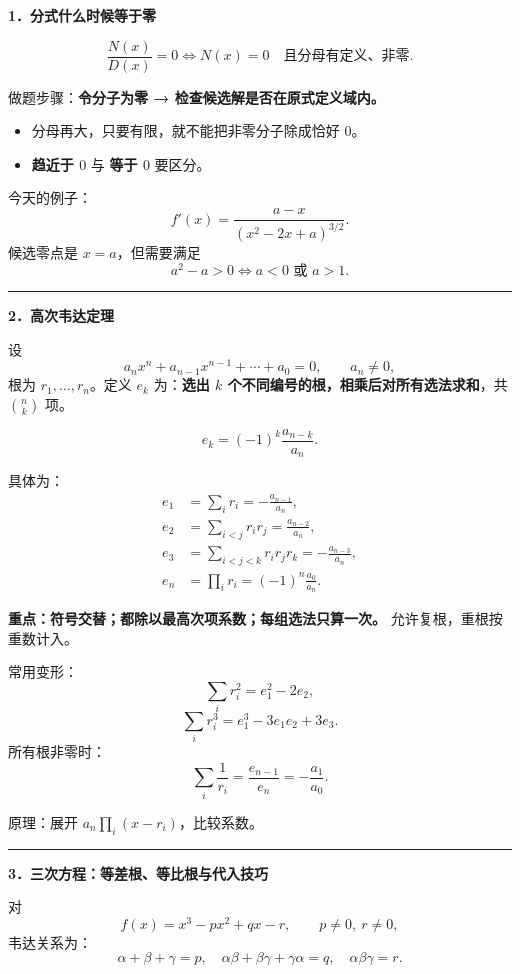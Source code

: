 \documentclass[
  UTF8]{ctexart}
\author{}
\date{}
\providecommand{\tightlist}{%
  \setlength{\itemsep}{0pt}\setlength{\parskip}{0pt}}
\begin{document}
\textbf{1．分式什么时候等于零}

\[
\boxed{
\frac{N(x)}{D(x)}=0
\iff
N(x)=0\quad\text{且分母有定义、非零}.
}
\]

做题步骤：\textbf{令分子为零 → 检查候选解是否在原式定义域内。}

\begin{itemize}
\tightlist
\item
  分母再大，只要有限，就不能把非零分子除成恰好 \(0\)。
\item
  \textbf{趋近于 \(0\)} 与 \textbf{等于 \(0\)} 要区分。
\end{itemize}

今天的例子： \[
f'(x)=\frac{a-x}{(x^2-2x+a)^{3/2}}.
\] 候选零点是 \(x=a\)，但需要满足 \[
a^2-a>0
\iff
\boxed{a<0\text{ 或 }a>1}.
\]

\begin{center}\rule{0.5\linewidth}{0.5pt}\end{center}

\textbf{2．高次韦达定理}

设 \[
a_nx^n+a_{n-1}x^{n-1}+\cdots+a_0=0,\qquad a_n\ne0,
\] 根为 \(r_1,\ldots,r_n\)。定义 \(e_k\) 为：\textbf{选出 \(k\)
个不同编号的根，相乘后对所有选法求和}，共 \(\binom nk\) 项。

\[
\boxed{e_k=(-1)^k\frac{a_{n-k}}{a_n}}.
\]

具体为： \[
\begin{aligned}
e_1&=\sum_i r_i=-\frac{a_{n-1}}{a_n},\\
e_2&=\sum_{i<j}r_ir_j=\frac{a_{n-2}}{a_n},\\
e_3&=\sum_{i<j<k}r_ir_jr_k=-\frac{a_{n-3}}{a_n},\\
e_n&=\prod_i r_i=(-1)^n\frac{a_0}{a_n}.
\end{aligned}
\]

\textbf{重点：符号交替；都除以最高次项系数；每组选法只算一次。}
允许复根，重根按重数计入。

常用变形： \[
\boxed{\sum_i r_i^2=e_1^2-2e_2},
\] \[
\boxed{\sum_i r_i^3=e_1^3-3e_1e_2+3e_3}.
\] 所有根非零时： \[
\boxed{\sum_i\frac1{r_i}=\frac{e_{n-1}}{e_n}=-\frac{a_1}{a_0}}.
\]

原理：展开 \(a_n\prod_i(x-r_i)\)，比较系数。

\begin{center}\rule{0.5\linewidth}{0.5pt}\end{center}

\textbf{3．三次方程：等差根、等比根与代入技巧}

对 \[
f(x)=x^3-px^2+qx-r,\qquad p\ne0,\ r\ne0,
\] 韦达关系为： \[
\boxed{\alpha+\beta+\gamma=p,\quad
\alpha\beta+\beta\gamma+\gamma\alpha=q,\quad
\alpha\beta\gamma=r}.
\]
\end{document}
